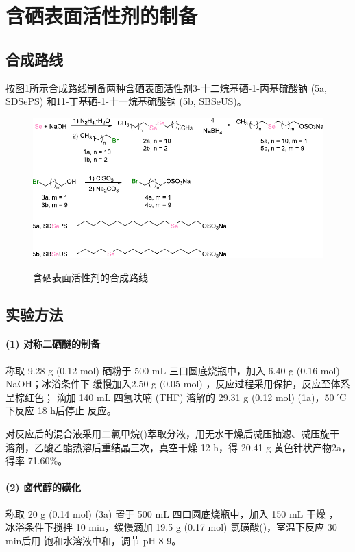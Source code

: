 \documentclass[bachelor,winfonts,replaceperiod]{jnuthesis}
\begin{document}
    \section{含硒表面活性剂的制备}
    \subsection{合成路线}
    按图\ref{fig:scheme-synthesis}所示合成路线制备两种含硒表面活性剂3-十二烷基硒-1-丙基硫酸钠 
    (5a, SDSePS) 和11-丁基硒-1-十一烷基硫酸钠 (5b, SBSeUS)。
    \begin{figure}[htbp]
        \centering
        \includegraphics[scale=1]{figure/scheme-synthesis.pdf}\\
        \caption{含硒表面活性剂的合成路线}\label{fig:scheme-synthesis}
    \end{figure}

    \subsection{实验方法}
    \paragraph*{(1) 对称二硒醚的制备}
    称取 9.28 g (0.12 mol) 硒粉于 500 mL 三口圆底烧瓶中，加入 6.40 g (0.16 mol) NaOH；冰浴条件下
    缓慢加入2.50 g (0.05 mol) ，反应过程采用保护，反应至体系呈棕红色； 
    滴加 140 mL 四氢呋喃 (THF) 溶解的 29.31 g (0.12 mol)  (1a)，50 ℃下反应 18 h后停止
    反应。
    
    对反应后的混合液采用二氯甲烷()萃取分液，用无水干燥后减压抽滤、减压旋干
    溶剂，乙酸乙酯热溶后重结晶三次，真空干燥 12 h，得 20.41 g 黄色针状产物2a，得率 71.60\%。
    
    \paragraph*{(2) 卤代醇的磺化}
    称取 20 g (0.14 mol)  (3a) 置于 500 mL 四口圆底烧瓶中，加入 150 mL 干燥 ，
    冰浴条件下搅拌 10 min，缓慢滴加 19.5 g (0.17 mol) 氯磺酸()，室温下反应 30 min后用
    饱和水溶液中和，调节 pH 8-9。
    
\end{document}
